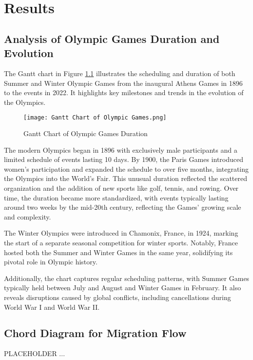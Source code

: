 \chapter{Results} \label{chap:res}

\section{Analysis of Olympic Games Duration and Evolution}

The Gantt chart in Figure \ref{fig:gantt_olympics} illustrates the scheduling and duration of both Summer and Winter Olympic Games from the inaugural Athens Games in 1896 to the events in 2022. It highlights key milestones and trends in the evolution of the Olympics.

\begin{figure}[ht]
    \centering
    \texttt{[image: Gantt Chart of Olympic Games.png]}
    \caption{Gantt Chart of Olympic Games Duration}
    \label{fig:gantt_olympics}
\end{figure}

The modern Olympics began in 1896 with exclusively male participants and a limited schedule of events lasting 10 days. By 1900, the Paris Games introduced women's participation and expanded the schedule to over five months, integrating the Olympics into the World’s Fair. This unusual duration reflected the scattered organization and the addition of new sports like golf, tennis, and rowing. Over time, the duration became more standardized, with events typically lasting around two weeks by the mid-20th century, reflecting the Games' growing scale and complexity.

The Winter Olympics were introduced in Chamonix, France, in 1924, marking the start of a separate seasonal competition for winter sports. Notably, France hosted both the Summer and Winter Games in the same year, solidifying its pivotal role in Olympic history.

Additionally, the chart captures regular scheduling patterns, with Summer Games typically held between July and August and Winter Games in February. It also reveals disruptions caused by global conflicts, including cancellations during World War I and World War II.

\section{Chord Diagram for Migration Flow}

PLACEHOLDER ...

